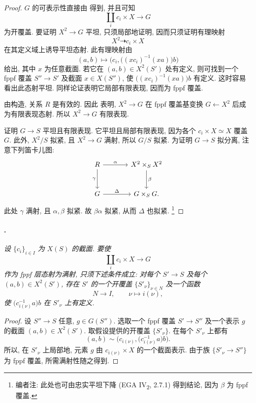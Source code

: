 \begin{proof}
\(G\) 的可表示性直接由 得到,
并且可知
\[
  \coprod_i c_i\times X\longrightarrow G
\]
为开覆盖. 要证明 \(X^2\to G\) 平坦, 只须局部地证明,
因而只须证明有理映射
\[
  X^2\dashrightarrow c_i\times X
\]
在其定义域上诱导平坦态射. 此有理映射由
\[
  (a,b)\longmapsto
  \bigl(c_i,\bigl((xc_i)^{-1}(xa)\bigr)b\bigr)
\]
给出, 其中 \(x\) 为任意截面.
若它在 \((a,b)\in X^2(S')\) 处有定义,
则可找到一个 fppf 覆盖 \(S''\to S'\) 及截面 \(x\in X(S'')\),
使 \(\bigl((xc_i)^{-1}(xa)\bigr)b\) 有定义.
这时容易看出此态射平坦. 同样论证表明它局部有限表现, 因而为 fppf 覆盖.

由构造, 关系 \(R\) 是有效的.
因此 表明,
\(X^2\to G\) 在 fppf 覆盖基变换 \(G\leftarrow X^2\) 后成为有限表现态射.
所以 \(X^2\to G\) 有限表现.

证明 \(G\to S\) 平坦且有限表现.
它平坦且局部有限表现, 因为各个 \(c_i\times X\simeq X\) 覆盖 \(G\).
此外, \(X^2/S\) 拟紧, 且 \(X^2\to G\) 满射, 所以 \(G/S\) 拟紧.
为证明 \(G\to S\) 拟分离, 注意下列笛卡儿图:
\[
\begin{tikzcd}[column sep=large,row sep=large]
  R \arrow[r,"\alpha"] \arrow[d,"\gamma"'] &
  X^2\times_S X^2 \arrow[d,"\beta"]\\
  G \arrow[r,"\Delta"] & G\times_S G.
\end{tikzcd}
\]
此处 \(\gamma\) 满射, 且 \(\alpha,\beta\) 拟紧.
故 \(\beta\alpha\) 拟紧, 从而 \(\Delta\) 也拟紧.
\footnote{编者注: 此处也可由忠实平坦下降
\textup{(EGA IV\textsubscript{2}, 2.7.1)} 得到结论, 因为 \(\beta\) 为 fppf 覆盖.}
\end{proof}

\paragraph{.}
\textit{设 \(\{c_i\}_{i\in I}\) 为 \(X(S)\) 的截面.
要使
\[
  \coprod_i c_i\times X\longrightarrow G
\]
作为 fppf 层态射为满射, 只须下述条件成立:
对每个 \(S'\to S\) 及每个 \((a,b)\in X^2(S')\),
存在 \(S'\) 的一个开覆盖 \(\{S'_\nu\}_{\nu\in N}\) 及一个函数
\[
  N\longrightarrow I,\qquad \nu\longmapsto i(\nu),
\]
使 \(\bigl(c_{i(\nu)}^{-1}a\bigr)b\) 在 \(S'_\nu\) 上有定义.}

\begin{proof}
设 \(S''\to S\) 任意, \(g\in G(S'')\).
选取一个 fppf 覆盖 \(S'\to S''\) 及一个表示 \(g\) 的截面 \((a,b)\in X^2(S')\).
取假设提供的开覆盖 \(\{S'_\nu\}\). 在每个 \(S'_\nu\) 上都有
\[
  (a,b)\sim
  \bigl(c_{i(\nu)},\bigl(c_{i(\nu)}^{-1}a\bigr)b\bigr).
\]
所以, 在 \(S'_\nu\) 上局部地, 元素 \(g\) 由 \(c_{i(\nu)}\times X\) 的一个截面表示.
由于族 \(\{S'_\nu\to S''\}\) 为 fppf 覆盖, 所需满射性随之得到.
\end{proof}

